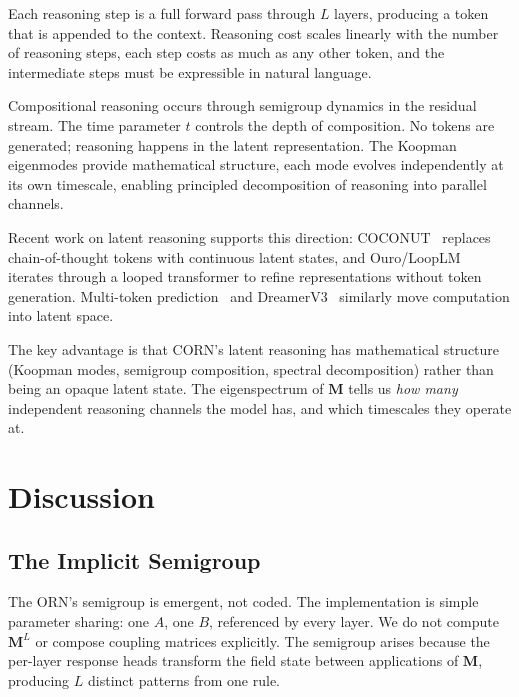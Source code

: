 \documentclass[11pt, a4paper]{article}
\newcommand{\M}{\mathbf{M}}
\theoremstyle{plain}
\theoremstyle{remark}
\begin{document}
\begin{description}[nosep, leftmargin=1.5em]
    \item[Token-space reasoning (CoT):] Each reasoning step is a full forward pass through $L$ layers, producing a token that is appended to the context.
    Reasoning cost scales linearly with the number of reasoning steps, each step costs as much as any other token, and the intermediate steps must be expressible in natural language.

    \item[Latent-space reasoning (CORN):] Compositional reasoning occurs through semigroup dynamics in the residual stream.
    The time parameter $t$ controls the depth of composition.
    No tokens are generated; reasoning happens in the latent representation.
    The Koopman eigenmodes provide mathematical structure, each mode evolves independently at its own timescale, enabling principled decomposition of reasoning into parallel channels.
\end{description}

Recent work on latent reasoning supports this direction: COCONUT~\cite{coconut2024} replaces chain-of-thought tokens with continuous latent states, and Ouro/LoopLM~\cite{ouro2025} iterates through a looped transformer to refine representations without token generation.
Multi-token prediction~\cite{gloeckle2024multi} and DreamerV3~\cite{hafner2025dreamerv3} similarly move computation into latent space.

The key advantage is that CORN's latent reasoning has mathematical structure (Koopman modes, semigroup composition, spectral decomposition) rather than being an opaque latent state.
The eigenspectrum of $\M$ tells us \emph{how many} independent reasoning channels the model has, and which timescales they operate at.

\section{Discussion}

\subsection{The Implicit Semigroup}

The ORN's semigroup is emergent, not coded.
The implementation is simple parameter sharing: one $A$, one $B$, referenced by every layer.
We do not compute $\M^L$ or compose coupling matrices explicitly.
The semigroup arises because the per-layer response heads transform the field state between applications of $\M$, producing $L$ distinct patterns from one rule.
\end{document}
